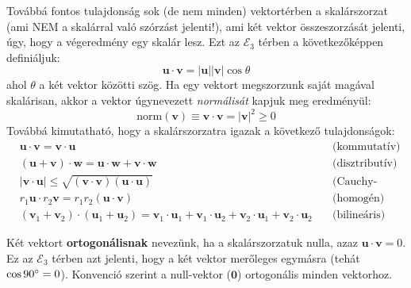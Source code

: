 \documentclass[../main.tex]{subfiles}
\begin{document}
Továbbá fontos tulajdonság sok (de nem minden) vektortérben a skalárszorzat (ami NEM a skalárral való szórzást jelenti!), ami két vektor összeszorzását jelenti, úgy, hogy a végeredmény egy skalár lesz.
Ezt az $\mathcal{E}_3$ térben a következőképpen definiáljuk:
\begin{equation}
    \mathbf{u} \cdot \mathbf{v} = |\mathbf{u}||\mathbf{v}|\cos\theta
\end{equation}
ahol $\theta$ a két vektor közötti szög. Ha egy vektort megszorzunk saját magával skalárisan, akkor a vektor úgynevezett \textit{normálisát} kapjuk meg eredményül:
\begin{equation}
    \text{norm}(\mathbf{v}) \equiv \mathbf{v} \cdot \mathbf{v} = |\mathbf{v}|^2 \geq 0
\end{equation}
Továbbá kimutatható, hogy a skalárszorzatra igazak a következő tulajdonságok:
\begin{equation}
    \begin{aligned}
        &\mathbf{u} \cdot \mathbf{v} = \mathbf{v} \cdot \mathbf{u} \quad &\text{(kommutatív)}\\
        &(\mathbf{u} + \mathbf{v}) \cdot \mathbf{w} = \mathbf{u} \cdot \mathbf{w} + \mathbf{v} \cdot \mathbf{w} \quad &\text{(disztributív)}\\
        &|\mathbf{v} \cdot \mathbf{u}| \leq \sqrt{(\mathbf{v} \cdot \mathbf{v})(\mathbf{u} \cdot \mathbf{u})} \quad &\text{(Cauchy-Schwarz egyenlőtlenség)} \\
        &r_1 \mathbf{u} \cdot r_2 \mathbf{v} = r_1 r_2 (\mathbf{u} \cdot \mathbf{v}) \quad &\text{(homogén)} \\
        &(\mathbf{v}_1 + \mathbf{v}_2) \cdot (\mathbf{u}_1 + \mathbf{u}_2) = \mathbf{v}_1 \cdot \mathbf{u}_1 + \mathbf{v}_1 \cdot \mathbf{u}_2 + \mathbf{v}_2 \cdot \mathbf{u}_1 + \mathbf{v}_2 \cdot \mathbf{u}_2 \quad &\text{(bilineáris)}
    \end{aligned}
\end{equation}

Két vektort \textbf{ortogonálisnak} nevezünk, ha a skalárszorzatuk nulla, azaz $\mathbf{u} \cdot \mathbf{v} = 0$. Ez az $\mathcal{E}_3$ térben azt jelenti, hogy a két vektor merőleges egymásra (tehát $\cos 90\degree = 0$).
Konvenció szerint a null-vektor ($\mathbf{0}$) ortogonális minden vektorhoz.
\end{document}
